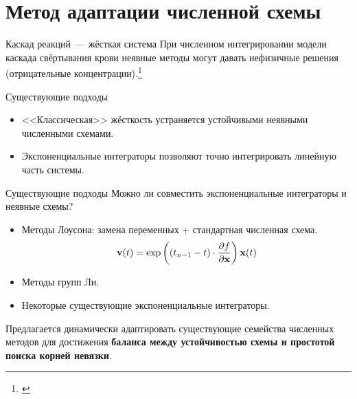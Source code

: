 \documentclass[
    14pt,
    xcolor=dvipsnames,
    aspectratio=169
]{beamer}
\begin{document}
\section{Метод адаптации численной схемы}

\begin{frame}{Каскад реакций~--- жёсткая система}
    При численном интегрировании модели каскада свёртывания крови
    неявные методы могут давать нефизичные решения (отрицательные концентрации).\footnote{\textcite{vassilevski2020parallel, butakov2022two_methods}}
\end{frame}

\begin{frame}{Существующие подходы}
    \begin{itemize}
        \item<1-> <<Классическая>> жёсткость устраняется устойчивыми неявными численными схемами.
        \item Экспоненциальные интеграторы позволяют точно интегрировать линейную часть системы.
    \end{itemize}
\end{frame}

\begin{frame}{Существующие подходы}
    Можно ли совместить экспоненциальные интеграторы и неявные схемы?
    \begin{itemize}
        \item Методы Лоусона: замена переменных + стандартная численная схема.
            \[
                \mathbf{v}(t) = \exp\left((t_{n-1} - t) \cdot \frac{\partial f}{\partial \mathbf{x}}\right) \mathbf{x}(t)
            \]
        \item Методы групп Ли.
        \item Некоторые существующие экспоненциальные интеграторы.
    \end{itemize}
\end{frame}

\begin{frame}{\secname}
    Предлагается динамически адаптировать существующие семейства численных методов для достижения
    \textbf{баланса между устойчивостью схемы и простотой поиска корней невязки}.
\end{frame}
\end{document}
